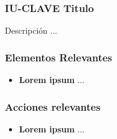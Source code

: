 
\subsubsection{IU-CLAVE Titulo}

 Descripción ...


\subsubsection{Elementos Relevantes}

    \begin{itemize}
    \item {\bf Lorem ipsum}
        ...
    \end{itemize}

\subsubsection{Acciones relevantes}

    \begin{itemize}
    \item {\bf Lorem ipsum}
        ...
    \end{itemize}

\clearpage

